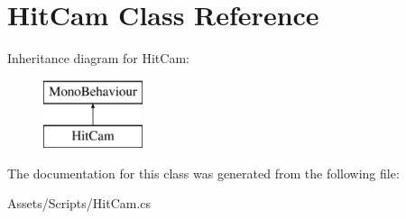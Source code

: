 \hypertarget{class_hit_cam}{}\section{Hit\+Cam Class Reference}
\label{class_hit_cam}
Inheritance diagram for Hit\+Cam\+:\begin{figure}[H]
\begin{center}
\leavevmode
\includegraphics[height=2.000000cm]{class_hit_cam}
\end{center}
\end{figure}


The documentation for this class was generated from the following file\+:\begin{DoxyCompactItemize}
\item 
Assets/\+Scripts/Hit\+Cam.\+cs\end{DoxyCompactItemize}
